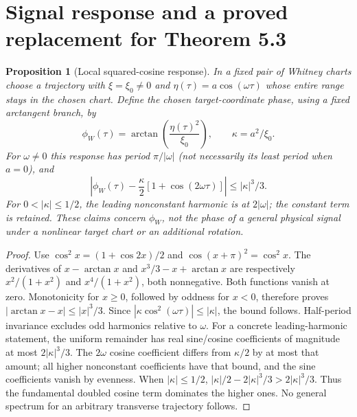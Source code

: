 \documentclass[11pt,a4paper]{article}
\newtheorem{proposition}[theorem]{Proposition}
\theoremstyle{definition}\newtheorem{definition}[theorem]{Definition}
\theoremstyle{remark}\newtheorem{remark}[theorem]{Remark}
\begin{document}
\section{Signal response and a proved replacement for Theorem 5.3}
\begin{proposition}[Local squared-cosine response]\label{prop:response}
In a fixed pair of Whitney charts choose a trajectory with
$\xi=\xi_0\ne0$ and $\eta(\tau)=a\cos(\omega\tau)$ whose entire
range stays in the chosen chart. Define the chosen target-coordinate
phase, using a fixed arctangent branch, by
\[
 \phi_W(\tau)=\arctan\left(\frac{\eta(\tau)^2}{\xi_0}\right),\qquad
 \kappa=a^2/\xi_0.
\]
For $\omega\ne0$ this response has period $\pi/|\omega|$ (not
necessarily its least period when $a=0$), and
\begin{equation}\label{eq:response-bound}
 \left|\phi_W(\tau)-\frac\kappa2[1+\cos(2\omega\tau)]\right|
       \leq |\kappa|^3/3.
\end{equation}
For $0<|\kappa|\leq1/2$, the leading nonconstant harmonic is at
$2|\omega|$; the constant term is retained. These claims concern
$\phi_W$, not the phase of a general physical signal under a nonlinear
target chart or an additional rotation.
\end{proposition}
\begin{proof}
Use $\cos^2 x=(1+\cos2x)/2$ and
$\cos(x+\pi)^2=\cos^2x$. The derivatives of
$x-\arctan x$ and $x^3/3-x+\arctan x$ are respectively
$x^2/(1+x^2)$ and $x^4/(1+x^2)$, both nonnegative.
Both functions vanish at zero. Monotonicity for $x\geq0$, followed by
oddness for $x<0$, therefore proves
$|\arctan x-x|\leq |x|^3/3$.
Since $|\kappa\cos^2(\omega\tau)|\leq|\kappa|$, the bound follows.
Half-period invariance excludes odd harmonics relative to $\omega$.
For a concrete leading-harmonic statement, the uniform remainder has
real sine/cosine coefficients of magnitude at most $2|\kappa|^3/3$.
The $2\omega$ cosine coefficient differs from $\kappa/2$ by at most
that amount; all higher nonconstant coefficients have that bound, and
the sine coefficients vanish by evenness. When $|\kappa|\leq1/2$,
$|\kappa|/2-2|\kappa|^3/3>2|\kappa|^3/3$.
Thus the fundamental doubled cosine term dominates the higher ones.
No general spectrum for an arbitrary transverse trajectory follows.
\end{proof}
\end{document}
